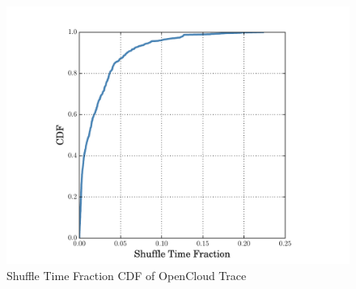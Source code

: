 \begin{figure}
	\centering
	\includegraphics[width=0.75\linewidth]{fig/reduce_cdf}
	\caption{Shuffle Time Fraction CDF of OpenCloud Trace}
	\label{fig:cdf}
\end{figure}


